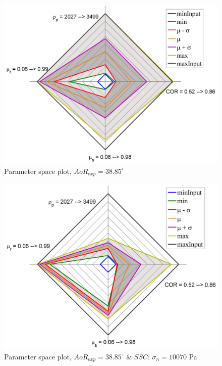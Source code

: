 \begin{figure}%
\centering 
\includegraphics[width=.48\columnwidth]{images/031radarpirker1aor} 
\caption{Parameter space plot, $AoR_{exp} = 38.85 ^\circ$}
\label{fig:031radarpirker1aor} 
\end{figure}
\begin{figure}%
\centering 
\includegraphics[width=.48\columnwidth]{images/033radarpirker1schulze10070aor} 
\caption{Parameter space plot, $AoR_{exp} = 38.85
        ^\circ$ \& $SSC$: $\sigma_n=10070$ Pa}
\label{fig:033radarpirker1schulze10070aor} 
\end{figure}
